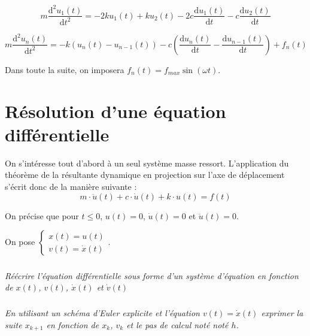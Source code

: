 \documentclass[10pt]{article}
\newif\ifprof
\begin{document}
\begin{equation}
m\dfrac{\text{d}^2u_1(t)}{\text{d}t^2} = 
- 2k u_1(t) + k u_2 (t) 
-2c \dfrac{\text{d}u_1(t)}{\text{d}t} 
- c \dfrac{\text{d}u_2(t)}{\text{d}t} 
\end{equation}

\begin{equation}
m\dfrac{\text{d}^2u_n(t)}{\text{d}t^2} = 
-k\left(u_n(t)-u_{n-1}(t) \right)   - c\left(\dfrac{\text{d}u_{n}(t)}{\text{d}t}-\dfrac{\text{d}u_{n-1}(t)}{\text{d}t} \right) +f_n(t)
\end{equation}


Dans toute la suite, on imposera $f_n(t)=f_{max} \sin \left(\omega t\right)$.

\section{Résolution d'une équation différentielle}
On s'intéresse tout d'abord à un seul système masse ressort. L'application du théorème de la résultante dynamique en projection sur l'axe de déplacement s'écrit donc 
de la manière suivante : 
$$
m\cdot\ddot{u}(t)+c\cdot \dot{u}(t) + k\cdot u(t) = f(t)
$$

On précise que pour $t\leq 0$, $u(t)=0$, $\dot{u}(t)=0$ et $\ddot{u}(t)=0$.

On pose $\left\{ \begin{array}{l} x(t) = u(t) \\ v(t) = \dot{x}(t)\end{array} \right.$.

\subparagraph{}
\textit{Réécrire l'équation différentielle sous forme d'un système d'équation en fonction de $x(t)$,  $v(t)$, $\dot{x}(t)$ et $\dot{v}(t)$}
\ifprof
\begin{corrige}
On a donc : 
$$
\left\{ 
\begin{array}{l} 
v(t) = \dot{x}(t) \\ 
m\cdot\dot{v}(t)+c\cdot {v}(t) + k\cdot x(t) = f(t)
\end{array} \right.
$$
\end{corrige}
\else
\fi

\subparagraph{}
\textit{En utilisant un schéma d'Euler explicite et l'équation $v(t) = \dot{x}(t)$ 
exprimer la suite $x_{k+1}$ en fonction de $x_k$, $v_k$ et le pas de calcul noté noté $h$.}

\ifprof
\begin{corrige}
On a $\dfrac{dx(t)}{dt} \simeq \dfrac{x_{k+1}-x_k}{h}$. On a donc 
$v_k = \dfrac{x_{k+1}-x_k}{h} \Longleftrightarrow x_{k+1} = h\cdot v_k + x_k$.
\end{corrige}
\else
\fi
\end{document}
